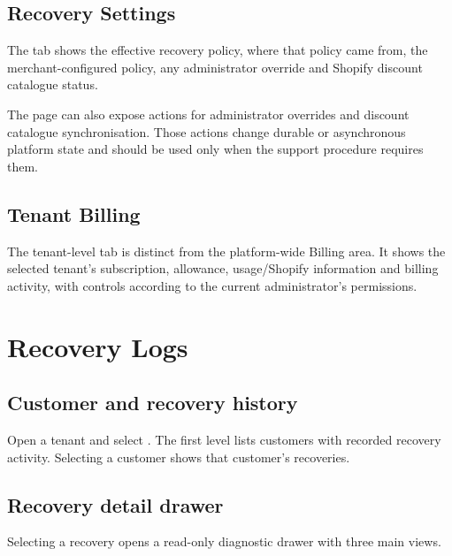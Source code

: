 
\section{Recovery Settings}
The  tab shows the effective recovery policy, where that policy came from, the merchant-configured policy, any administrator override and Shopify discount catalogue status.


The page can also expose actions for administrator overrides and discount catalogue synchronisation. Those actions change durable or asynchronous platform state and should be used only when the support procedure requires them.

\section{Tenant Billing}
The tenant-level  tab is distinct from the platform-wide Billing area. It shows the selected tenant's subscription, allowance, usage/Shopify information and billing activity, with controls according to the current administrator's permissions.


\chapter{Recovery Logs}

\section{Customer and recovery history}
Open a tenant and select . The first level lists customers with recorded recovery activity. Selecting a customer shows that customer's recoveries.


\section{Recovery detail drawer}
Selecting a recovery opens a read-only diagnostic drawer with three main views.

